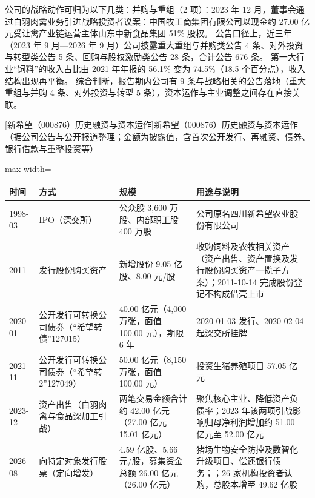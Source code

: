  公司的战略动作可归为以下几类：并购与重组（2 项）：2023 年 12 月，董事会通过白羽肉禽业务引进战略投资者议案：中国牧工商集团有限公司以现金约 27.00 亿元受让禽产业链运营主体山东中新食品集团 51\% 股权。 公告口径上，近三年（2023 年 9 月---2026 年 9 月）公司披露重大重组与并购类公告 4 条、对外投资与转型类公告 5 条、回购与股权激励类公告 28 条，合计公告 676 条。 第一大行业“饲料”的收入占比由 2021 年年报的 56.1\% 变为 74.5\%（18.5 个百分点），收入结构出现再平衡。 综合判断，报告期内公司有 9 条与战略相关的公告落地（重大重组与并购 4 条、对外投资与转型 5 条），资本运作与主业调整之间存在直接关联。

\begin{center}\small\setlength{\tabcolsep}{4pt}
[新希望（000876）历史融资与资本运作]{新希望（000876）历史融资与资本运作（据公司公告与公开报道整理；金额为披露值，含首次公开发行、再融资、债券、银行借款与重整投资等）}
\begin{adjustbox}{max width=\textwidth}
\begin{tabular}{@{}p{1.45cm}p{2.55cm}p{4.05cm}p{4.95cm}@{}}
\toprule
时间 & 方式 & 规模 & 用途与说明 \\
\midrule
1998-03 & IPO（深交所） & 公众股 3,\allowbreak{}600 万股、\allowbreak{}内部职工股 400 万股 & 公司原名四川新希望农业股份有限公司 \\
2011 & 发行股份购买资产 & 新增股份 9.05 亿股、\allowbreak{}8.00 元/\allowbreak{}股 & 收购饲料及农牧相关资产（资产出售、\allowbreak{}资产置换及发行股份购买资产一揽子方案）；2011-10-14 完成股份登记不构成借壳上市 \\
2020-01 & 公开发行可转换公司债券（“希望转债”127015） & 40.00 亿元（4,\allowbreak{}000 万张，\allowbreak{}面值 100.00 元），\allowbreak{}期限 6 年 & 2020-01-03 发行、\allowbreak{}2020-02-04 起深交所挂牌 \\
2021-11 & 公开发行可转换公司债券（“希望转2”127049） & 50.00 亿元（8,\allowbreak{}150 万张，\allowbreak{}面值 100.00 元） & 投资生猪养殖项目 57.05 亿元 \\
2023-12 & 资产出售（白羽肉禽与食品深加工引战） & 两笔交易金额合计约 42.00 亿元（27.00 亿元 + 15.01 亿元） & 聚焦核心主业、\allowbreak{}降低资产负债率；2023 年该两项引战影响归母净利润增加约 51.00 亿元至 52.00 亿元 \\
2026-08 & 向特定对象发行股票（定向增发） & 4.59 亿股、\allowbreak{}5.66 元/\allowbreak{}股，\allowbreak{}募集资金总额 26.00 亿元（26.00 亿元） & 猪场生物安全防控及数智化升级项目、\allowbreak{}偿还银行债务；；26 家机构投资者认购，\allowbreak{}总股本增至 49.62 亿股 \\
\bottomrule
\end{tabular}
\end{adjustbox}
\end{center}

